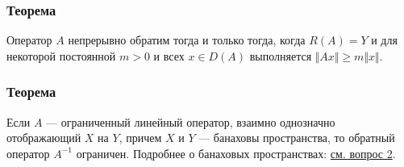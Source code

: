 \subsubsection*{Теорема}
Оператор $A$ непрерывно обратим тогда и только тогда, когда $R(A) = Y$ и для некоторой постоянной $m > 0$ и всех $x \in D(A)$ выполняется $\Vert Ax \Vert \geqslant m \Vert x \Vert$\cite[с.~128]{trenogin}.

\subsubsection*{Теорема}
Если $A$ --- ограниченный линейный оператор, взаимно однозначно отображающий $X$ на $Y$, причем $X$ и $Y$ --- банаховы пространства, то обратный оператор $A^{-1}$ ограничен\cite[с.~128]{trenogin}. Подробнее о банаховых пространствах: \hyperref[sec:q-2]{см. вопрос 2}.
